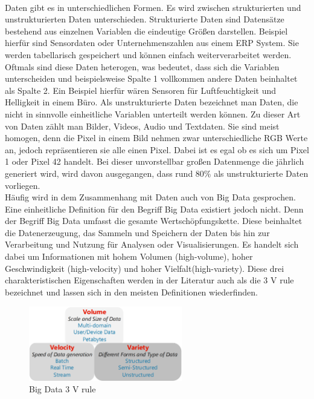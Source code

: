\begin{onehalfspace}
        \\
        Daten gibt es in unterschiedlichen Formen. Es wird zwischen strukturierten und unstrukturierten Daten unterschieden. Strukturierte Daten sind Datensätze bestehend aus einzelnen Variablen die eindeutige Größen darstellen. Beispiel hierfür sind Sensordaten oder Unternehmenszahlen aus einem ERP System. Sie werden tabellarisch gespeichert und können einfach weiterverarbeitet werden. Oftmals sind diese Daten heterogen, was bedeutet, dass sich die Variablen unterscheiden und beispielsweise Spalte 1 vollkommen andere Daten beinhaltet als Spalte 2. Ein Beispiel hierfür wären Sensoren für Luftfeuchtigkeit und Helligkeit in einem Büro. Als unstrukturierte Daten bezeichnet man Daten, die nicht in sinnvolle einheitliche Variablen unterteilt werden können. Zu dieser Art von Daten zählt man Bilder, Videos, Audio und Textdaten. Sie sind meist homogen, denn die Pixel in einem Bild nehmen zwar unterschiedliche RGB Werte an, jedoch repräsentieren sie alle einen Pixel. Dabei ist es egal ob es sich um Pixel 1 oder Pixel 42 handelt.\cite{Horn2022} Bei dieser unvorstellbar großen Datenmenge die jährlich generiert wird, wird davon ausgegangen, dass rund 80\% als unstrukturierte Daten vorliegen.\cite{Otto2019}
        \\
        Häufig wird in dem Zusammenhang mit Daten auch von Big Data gesprochen. Eine einheitliche Definition für den Begriff Big Data existiert jedoch nicht. Denn der Begriff Big Data umfasst die gesamte Wertschöpfungskette. Diese beinhaltet die Datenerzeugung, das Sammeln und Speichern der Daten bis hin zur Verarbeitung und Nutzung für Analysen oder Visualisierungen.\cite{Taleb2018}\cite{Faroukhi2020} Es handelt sich dabei um Informationen mit hohem Volumen (high-volume), hoher Geschwindigkeit (high-velocity) und hoher Vielfalt(high-variety). Diese drei charakteristischen Eigenschaften werden in der Literatur auch als die \glqq{}3 V rule\grqq{} bezeichnet und lassen sich in den meisten Definitionen wiederfinden.\cite{Taleb2018}\cite{Yalaoui2021} 
        \begin{figure}[h]
            \centering
            \includegraphics[width = 6.7cm]{Bilder/3VRule.png}
            \caption{Big Data 3 V rule \cite{Taleb2018}}

\end{figure}
\end{onehalfspace}
